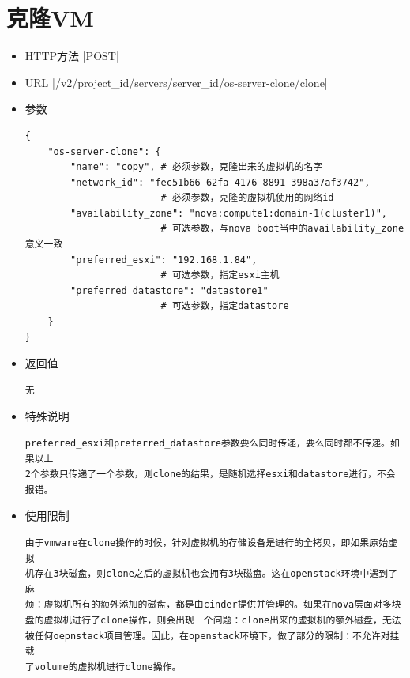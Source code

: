 \documentclass[oneside]{book}
\begin{document}
\section{克隆VM}
\begin{itemize}
\item HTTP方法
|POST|
\item URL
|/v2/{project_id}/servers/{server_id}/os-server-clone/clone|
\item 参数
\begin{verbatim}
{
    "os-server-clone": {
        "name": "copy", # 必须参数，克隆出来的虚拟机的名字
        "network_id": "fec51b66-62fa-4176-8891-398a37af3742",
                        # 必须参数，克隆的虚拟机使用的网络id
        "availability_zone": "nova:compute1:domain-1(cluster1)",
                        # 可选参数，与nova boot当中的availability_zone意义一致
        "preferred_esxi": "192.168.1.84",
                        # 可选参数，指定esxi主机
        "preferred_datastore": "datastore1"
                        # 可选参数，指定datastore
    }
}
\end{verbatim}
\item 返回值
\begin{verbatim}
无
\end{verbatim}
\item 特殊说明
\begin{verbatim}
preferred_esxi和preferred_datastore参数要么同时传递，要么同时都不传递。如果以上
2个参数只传递了一个参数，则clone的结果，是随机选择esxi和datastore进行，不会报错。
\end{verbatim}
\item 使用限制
\begin{verbatim}
由于vmware在clone操作的时候，针对虚拟机的存储设备是进行的全拷贝，即如果原始虚拟
机存在3块磁盘，则clone之后的虚拟机也会拥有3块磁盘。这在openstack环境中遇到了麻
烦：虚拟机所有的额外添加的磁盘，都是由cinder提供并管理的。如果在nova层面对多块
盘的虚拟机进行了clone操作，则会出现一个问题：clone出来的虚拟机的额外磁盘，无法
被任何oepnstack项目管理。因此，在openstack环境下，做了部分的限制：不允许对挂载
了volume的虚拟机进行clone操作。
\end{verbatim}
\end{itemize}
\end{document}
